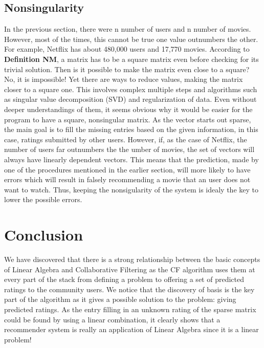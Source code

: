 \documentclass[paper=letter, fontsize=12pt]{scrartcl} %
\numberwithin{equation}{section} %
\numberwithin{figure}{section} %
\numberwithin{table}{section} %
\begin{document}
  \subsection{Nonsingularity}

  In the previous section, there were n number of users and n number of
  movies. However, most of the times, this cannot be true \textemdash one value
  outnumbers the other. For example, Netflix has about 480,000 users and 17,770 movies.
  According to \textbf{Definition NM}, a matrix has to be a square matrix even before
  checking for its trivial solution. Then is it possible to make the
  matrix even close to a square? No, it is impossible! Yet there are ways to
  reduce values, making the matrix closer to a square one. This involves complex
  multiple steps and algorithms such as singular value decomposition (SVD) and
  regularization of data. Even without deeper understandings of them, it seems
  obvious why it would be easier for the program to have a square, nonsingular
  matrix. As the vector starts out sparse, the main goal is to fill the missing
  entries based on the given information, in this case, ratings submitted by
  other users. However, if, as the case of Netflix, the number of users far
  outnumbers the the umber of movies, the set of vectors will always have
  linearly dependent vectors. This means that the prediction, made by one of the
  procedures mentioned in the earlier section, will more likely to have errors
  which will result in falsely recommending a movie that an user does not want
  to watch. Thus, keeping the nonsigularity of the system is idealy the key to
  lower the possible errors.

  \pagebreak

  \section{Conclusion}

  We have discovered that there is a strong relationship between the basic
  concepts of Linear Algebra and Collaborative Filtering as the CF algorithm uses
  them at every part of the stack from defining a problem to offering a set of
  predicted ratings to the community users. We notice that the discovery of
  basis is the key part of the algorithm as it gives a possible solution to the
  problem: giving predicted ratings. As the entry filling in an unknown rating
  of the sparse matrix could be found by using a linear combination, it clearly
  shows that a recommender system is really an application of Linear Algebra since
  it is a linear problem!
\end{document}
